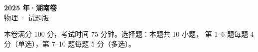 \documentclass[zihao=-4, a4paper]{ctexart}
\begin{document}
\begin{center}
  {\Large\bfseries 2025 年·湖南卷}\\[4pt]
  {\large 物理 · 试题版}
\end{center}
\medskip
\begin{gknotice}
  本卷满分 100 分，考试时间 75 分钟。选择题：本题共 10 小题，
  第 1--6 题每题 4 分（单选），第 7--10 题每题 5 分（多选）。
\end{gknotice}

\end{document}
